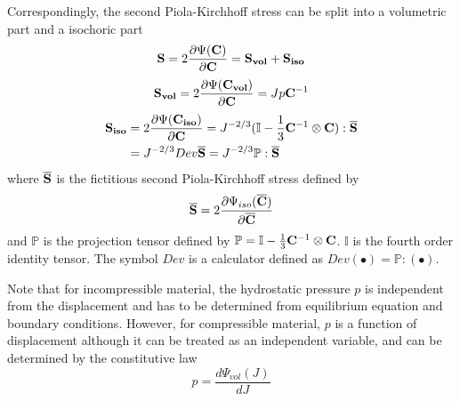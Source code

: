 Correspondingly, the second Piola-Kirchhoff stress can be split into a volumetric part and a isochoric part
\begin{equation} \label{S}
\bold{S} =  2\frac{\partial{\Psi({\bold{C})}}}{\partial{\bold{C}}} = \bold{S_{vol}}  + \bold{S_{iso}} 
\end{equation}
\begin{equation} \label{Svol}
\bold{S_{vol}} = 2\frac{\partial{\Psi({\bold{C_{vol}})}}}{\partial{\bold{C}}} = Jp{\bold{C}} ^{-1}
\end{equation}
\begin{equation} \label{Siso}
\begin{split}
\bold{S_{iso}} & = 2\frac{\partial{\Psi({\bold{C_{iso}})}}}{\partial{\bold{C}}} = J^{-2/3}(\mathbb{I} - \frac{1}{3}\bold{C}^{-1} \otimes \bold{C}):\overline{\bold{S}} \\
&  = J^{-2/3}Dev\overline{\bold{S}} = J^{-2/3}\mathbb{P}:\overline{\bold{S}}
\end{split}
\end{equation}
where  $\overline{\bold{S}}$ is the fictitious second Piola-Kirchhoff stress defined by
\begin{equation} \label{fictitious}
\overline{\bold{S}} = 2\frac{\partial\Psi_{iso}({\overline{\bold{C}})}}{\partial\overline{\bold{C}}}
\end{equation}
and $\mathbb{P}$ is the projection tensor defined by $\mathbb{P} = \mathbb{I} - \frac{1}{3}\bold{C}^{-1} \otimes \bold{C} $. $\mathbb{I}$ is the fourth order identity tensor. The symbol $Dev$ is a calculator defined as $Dev(\bullet) = \mathbb{P}:(\bullet)$.

Note that for incompressible material, the hydrostatic pressure $p$ is independent from the displacement and has to be determined from equilibrium equation and boundary conditions. However, for compressible material,  $p$ is a function of displacement although it can be treated as an independent variable, and can be determined by the constitutive law
\begin{equation} \label{pressure}
p = \frac{d\Psi_{vol}(J)}{dJ}
\end{equation}

%
